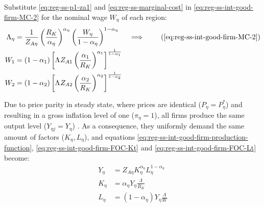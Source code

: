 \documentclass[../thesis.tex]{subfiles}
\begin{document}
Substitute \ref{eq:reg-ss-p1-za1} and \ref{eq:reg-ss-marginal-cost} in \ref{eq:reg-ss-int-good-firm-MC-2} for the nominal wage $W_{\eta}$ of each region:
\begin{alignat}{2}
	\Lambda_{\eta} &= \frac{1}{Z_{A\eta}} \left( \frac{R_K}{{\alpha_{\eta}}} \right)^{{\alpha_{\eta}}} \left( \frac{W_{\eta}}{1-{\alpha_{\eta}}} \right)^{1-{\alpha_{\eta}}} &\implies \tag{\ref{eq:reg-ss-int-good-firm-MC-2}} \\ 
	W_{1} &= (1-{\alpha_{1}}) \left[ \Lambda_{} Z_{A1} \left( \frac{{\alpha_{1}}}{R_K} \right)^{{\alpha_{1}}} \right]^\frac{1}{1-{\alpha_{1}}} & \label{eq:reg-ss-nominal-wage-1} \\
	W_{2} &= (1-{\alpha_{2}}) \left[ \Lambda_{} Z_{A2} \left( \frac{{\alpha_{2}}}{R_K} \right)^{{\alpha_{2}}} \right]^\frac{1}{1-{\alpha_{2}}} & \label{eq:reg-ss-nominal-wage-2}
\end{alignat}

\begin{comment}
	Substitute \ref{eq:reg-ss-nominal-wage} in \ref{eq:reg-ss-int-good-firm-MC-2} for the technology level of region 2, $Z_{A2}$:
	\begin{align}
		\Lambda_{\eta} &= \frac{1}{Z_{A\eta}} \left( \frac{R_K}{{\alpha_{\eta}}} \right)^{{\alpha_{\eta}}} \left( \frac{W}{1-{\alpha_{\eta}}} \right)^{1-{\alpha_{\eta}}} \implies \tag{\ref{eq:reg-ss-int-good-firm-MC-2}} \\
		Z_{A2} &= \frac{1}{\Lambda_{}} \left( \frac{R_K}{{\alpha_{\eta}}} \right)^{{\alpha_{\eta}}} \left( \frac{W}{1-{\alpha_{\eta}}} \right)^{1-{\alpha_{\eta}}} \label{eq:reg-ss-za2}
	\end{align}
\end{comment}

Due to price parity in steady state, where prices are identical ($P_{\eta} = P_{\eta}^{\ast}$) and resulting in a gross inflation level of one ($\pi_{\eta} = 1$), all firms produce the same output level ($Y_{\eta j} = Y_{\eta}$) \cite[Lecture 13, p.12]{solis-garcia_ucb_2022}. As a consequence, they uniformly demand the same amount of factors ($K_{\eta}, L_{\eta}$), and equations \ref{eq:reg-ss-int-good-firm-production-function}, \ref{eq:reg-ss-int-good-firm-FOC-Kt} and \ref{eq:reg-ss-int-good-firm-FOC-Lt} become: %
\begin{align}
	Y_{\eta} &= Z_{A\eta} K_{\eta}^{\alpha_{\eta}} L_{\eta}^{1 -{\alpha_{\eta}}} \label{eq:reg-ss-int-good-firm-production-function-2} \\	
	K_{\eta} &= {\alpha_{\eta}} Y_{\eta} \frac{\Lambda_{}}{R_K} \label{eq:reg-ss-int-good-firm-FOC-Kt-2} \\
	L_{\eta} &= (1-{\alpha_{\eta}}) Y_{\eta} \frac{\Lambda_{}}{W} \label{eq:reg-ss-int-good-firm-FOC-Lt-2}
\end{align}
	
\end{document}
